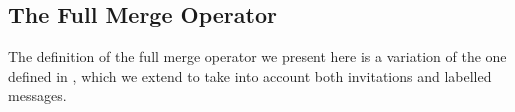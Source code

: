 \documentclass[12pt,twoside]{report}
\begin{document}









\subsection{The Full Merge Operator}

The definition of the full merge operator we present here is a variation of the one defined in \cite{featherweight}, which we extend to take into account both invitations and labelled messages.\\
\end{document}
